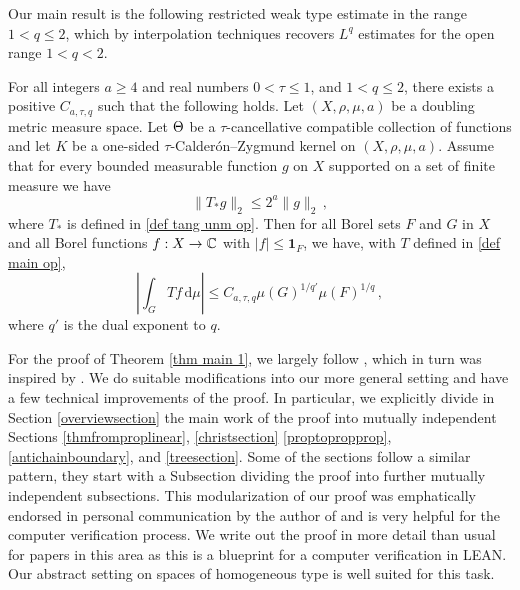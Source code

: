  
Our main result  is the following restricted weak type estimate in the range $1<q\le 2$, which by interpolation techniques recovers $L^q$ estimates for the open range
$1<q<2$.
\begin{theorem}
\label{thm main 1}
    For all  integers $a \ge  4$ and real numbers
    $0 < \tau\leq 1$,  and  $1<q\le 2$,
    there exists a positive $C_{a,\tau, q}$ such that the following holds.
    Let $(X,\rho,\mu,a)$ be a doubling metric measure space. Let  $\Theta$ be a
    $\tau$-cancellative compatible  collection of functions and let $K$ be a one-sided $\tau$-Calder\'on--Zygmund kernel on $(X,\rho,\mu,a)$. Assume  that for every bounded measurable function $g$ on $X$ supported on a set of finite measure we have
    \begin{equation}\label{nontanbound}
        \|T_{*}g\|_{2} \leq 2^a \|g\|_2\,,
    \end{equation}
    where $T_{*}$ is defined in
\eqref{def tang unm op}.
    Then for all Borel sets $F$ and $G$ in $X$ and
    all Borel functions $f:X\to \mathbb{C}$ with
    $|f|\le \mathbf{1}_F$, we have, with $T$ defined in  \eqref{def main op},
    \begin{equation}
    \label{resweak}
        \left|\int_{G} T f \, \mathrm{d}\mu\right| \leq C_{a,\tau, q} \mu(G)^{1/q'} \mu(F)^{1/q}\,,
        \end{equation}
where $q'$ is the dual exponent to $q$.
\end{theorem}


For the proof of Theorem \ref{thm main 1}, we largely follow \cite{zk-polynomial}, which in turn was inspired by \cite{lie-polynomial}.
We do suitable modifications into our more general setting and have a few technical improvements of the proof.  In particular, we explicitly divide
in Section \ref{overviewsection} the main work of the proof into mutually independent
Sections \ref{thmfromproplinear}, \ref{christsection}
\ref{proptopropprop},
\ref{antichainboundary},
and \ref{treesection}. Some of the sections follow a similar
pattern, they start with a Subsection dividing the
proof into further mutually independent subsections.
This modularization of our proof was emphatically endorsed in personal communication by the author of \cite{zk-polynomial} and is very helpful for the
computer verification process.
We write out the proof in more detail than usual
for papers in this area as this is a blueprint for a computer verification in LEAN.
Our abstract setting on spaces of homogeneous type
is well suited for this task.


